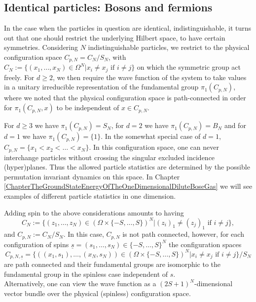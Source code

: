 	\subsection{Identical particles: Bosons and fermions}
		In the case when the particles in question are identical, \ie indistinguishable, it turns out that one should restrict the underlying Hilbert space, to have certain symmetries. Considering $ N $ indistinguishable particles, we restrict to the physical configuration space $ C_{p,N}=C_N/S_N $, with $ C_N:=\{(x_1,\ldots,x_N)\in \Omega^N \vert x_i\neq x_j \text{ if }i\neq j\} $ on which the symmetric group act freely. For $ d\geq 2 $, we then require the wave function of the system to take values in a unitary irreducible representation of the fundamental group $\pi_1(C_{p,N})$, where we noted that the physical configuration space is path-connected in order for $ \pi_1(C_{p,N},x) $ to be independent of $ x\in C_{p,N} $.
		\begin{remark}
			For $ d\geq 3 $ we have $\pi_1(C_{p,N})=S_N$, for $ d=2 $ we have $\pi_1(C_{p,N})=B_N$ and for $d=1$ we have $\pi_1(C_{p,N})=\{1\}$. In the somewhat special case of $d=1$, $C_{p,N}=\{x_1<x_2<\ldots<x_N\}$. In this configuration space, one can never interchange particles without crossing the singular excluded incidence (hyper)planes. Thus the allowed particle statistics are determined by the possible permutation invariant dynamics on this space. In Chapter \ref{ChapterTheGroundStateEnergyOfTheOneDimensionalDiluteBoseGas} we will see examples of different particle statistics in one dimension. 
		\end{remark}
		\begin{remark}
			Adding spin to the above considerations amounts to having $$C_N:=\{(z_1,\ldots,z_N)\in \left(\Omega\times\{-S,\ldots,S\}\right)^N \vert (z_i)_1\neq (z_j)_1 \text{ if }i\neq j\},$$ and $C_{p,N}:=C_N/S_N$. In this case, $C_{p,N}$ is not path connected, however, for each configuration of spins $ \underline{s}=(s_1,\ldots,s_N)\in\{-S,\ldots,S\}^N $ the configuration spaces $$ C_{p,N,\underline{s}}=\{((x_1,s_1),\ldots,(x_N,s_N))\in \left(\Omega\times\{-S,\ldots,S\}\right)^N \vert x_i\neq x_j \text{ if }i\neq j\}/S_N $$ 
			are path connected and their fundamental groups are isomorphic to the fundamental group in the spinless case independent of $ s $.\\
			Alternatively, one can view the wave function as a $ (2S+1)^N $-dimensional vector bundle over the physical (spinless) configuration space.
		\end{remark}
